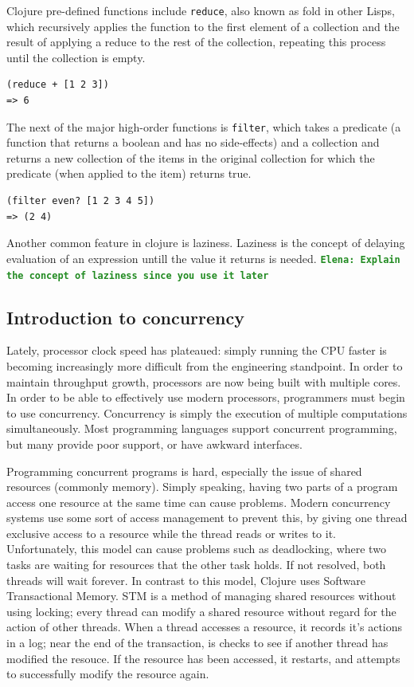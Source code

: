 \documentclass[12pt]{article}
\newcommand{\comment}[1]{{\bf \tt  {#1}}}
\newcommand{\emcomment}[1]{\textcolor{ForestGreen}{\comment{Elena: {#1}}}}
\newcommand{\clocode}[1]{{\texttt {#1}}}
\begin{document}
Clojure pre-defined functions include \clocode{reduce}, also known as fold in other Lisps, which recursively applies the function to the first element of a collection and the result of applying a reduce to the rest of the collection, repeating this process until the collection is empty.
\begin{verbatim}
(reduce + [1 2 3])
=> 6
\end{verbatim}
The next of the major high-order functions is \clocode{filter}, which takes a predicate (a function that returns a boolean and has no side-effects) and a collection and returns a new collection of the items in the original collection for which the predicate (when applied to the item) returns true.
\begin{verbatim}
(filter even? [1 2 3 4 5])
=> (2 4)
\end{verbatim}
Another common feature in clojure is laziness. Laziness is the concept of delaying evaluation of an expression untill the value it returns is needed.
\emcomment{Explain the concept of laziness since you use it later}

\subsection{Introduction to concurrency}\label{sec:concurrency}
 Lately, processor clock speed has plateaued: simply running the CPU faster is becoming increasingly more difficult from the engineering standpoint. 
In order to maintain throughput growth, processors are now being built with multiple cores. In order to be able to effectively use modern processors, programmers must begin to use concurrency. Concurrency is simply the execution of multiple computations simultaneously. Most programming languages support concurrent programming, but many provide poor support, or have awkward interfaces. 

Programming concurrent programs is hard, especially the issue of shared resources (commonly memory). Simply speaking, having two parts of a program access one resource at the same time can cause problems. Modern concurrency systems use some sort of access management to prevent this, by giving one thread exclusive access to a resource while the thread reads or writes to it. Unfortunately, this model can cause problems such as deadlocking, where two tasks are waiting for resources that the other task holds. If not resolved, both threads will wait forever. In contrast to this model, Clojure uses Software Transactional Memory. STM is a method of managing shared resources without using locking; every thread can modify a shared resource without regard for the action of other threads. When a thread accesses a resource, it records it's actions in a log; near the end of the transaction, is checks to see if another thread has modified the resouce. If the resource has been accessed, it restarts, and attempts to successfully modify the resource again.
\end{document}
